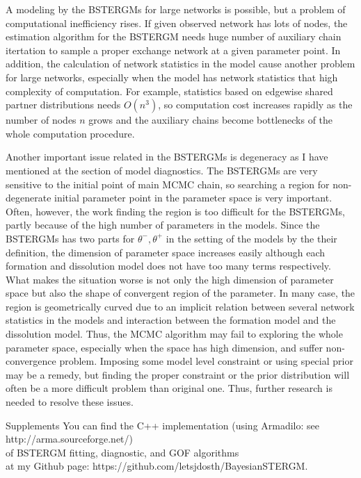 \documentclass[aspectratio=169,ignorenonframetext,9pt]{beamer}
\theoremstyle{plain}
\theoremstyle{definition}
\begin{document}
A modeling by the BSTERGMs for large networks is possible,
but a problem of computational inefficiency rises.
If given observed network has lots of nodes, the estimation algorithm for the BSTERGM needs 
huge number of auxiliary chain itertation to sample a proper exchange network at a given parameter point.
In addition, the calculation of network statistics in the model cause another problem for large networks,
especially when the model has network statistics that high complexity of computation.
For example, statistics based on edgewise shared partner distributions needs $O(n^3)$,
so computation cost increases rapidly as the number of nodes $n$ grows and
the auxiliary chains become bottlenecks of the whole computation procedure.

Another important issue related in the BSTERGMs is degeneracy as I have mentioned at the section of model diagnostics.
The BSTERGMs are very sensitive to the initial point of main MCMC chain, so
searching a region for non-degenerate initial parameter point in the parameter space is very important.
Often, however, the work finding the region is too difficult for the BSTERGMs,
partly because of the high number of parameters in the models.
Since the BSTERGMs has two parts for $\theta^-, \theta^+$ in the setting of the models by the their definition,
the dimension of parameter space increases easily although each formation and dissolution model does not have
too many terms respectively.
What makes the situation worse is not only the high dimension of parameter space but also the shape of convergent region of the parameter.
In many case, the region is geometrically curved due to an implicit relation between several network statistics in the models
and interaction between the formation model and the dissolution model.
Thus, the MCMC algorithm may fail to exploring the whole parameter space, especially when the space has high dimension,
and suffer non-convergence problem.
Imposing some model level constraint or using special prior may be a remedy,
but finding the proper constraint or the prior distribution will often be a more difficult problem than original one.
Thus, further research is needed to resolve these issues.


\begin{frame}{Supplements}
    You can find the C++ implementation (using Armadilo: see http://arma.sourceforge.net/)
    \\ of BSTERGM fitting, diagnostic, and GOF algorithms
    \\ at my Github page: https://github.com/letsjdosth/BayesianSTERGM.
\end{frame}



\nocite{*}


\end{document}
